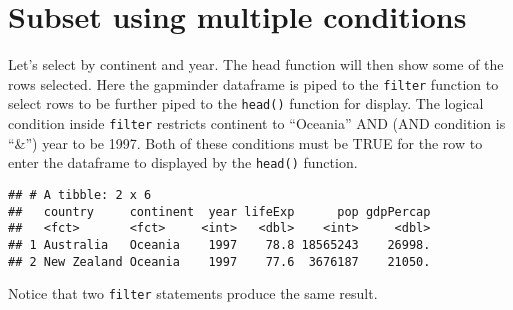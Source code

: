 \documentclass[
]{book}
\newenvironment{Shaded}{\begin{snugshade}}{\end{snugshade}}
\newcommand{\DecValTok}[1]{\textcolor[rgb]{0.00,0.00,0.81}{#1}}
\newcommand{\KeywordTok}[1]{\textcolor[rgb]{0.13,0.29,0.53}{\textbf{#1}}}
\newcommand{\NormalTok}[1]{#1}
\newcommand{\OperatorTok}[1]{\textcolor[rgb]{0.81,0.36,0.00}{\textbf{#1}}}
\newcommand{\StringTok}[1]{\textcolor[rgb]{0.31,0.60,0.02}{#1}}
\begin{document}
\hypertarget{subset-using-multiple-conditions}{%
\section{Subset using multiple conditions}\label{subset-using-multiple-conditions}}

Let's select by continent and year. The head function will then show some of the rows selected. Here the gapminder dataframe is piped to the \texttt{filter} function to select rows to be further piped to the \texttt{head()} function for display. The logical condition inside \texttt{filter} restricts continent to ``Oceania'' AND (AND condition is ``\&'') year to be 1997. Both of these conditions must be TRUE for the row to enter the dataframe to displayed by the \texttt{head()} function.

\begin{Shaded}
\end{Shaded}

\begin{verbatim}
## # A tibble: 2 x 6
##   country     continent  year lifeExp      pop gdpPercap
##   <fct>       <fct>     <int>   <dbl>    <int>     <dbl>
## 1 Australia   Oceania    1997    78.8 18565243    26998.
## 2 New Zealand Oceania    1997    77.6  3676187    21050.
\end{verbatim}

Notice that two \texttt{filter} statements produce the same result.

\begin{Shaded}
\end{Shaded}
\end{document}
